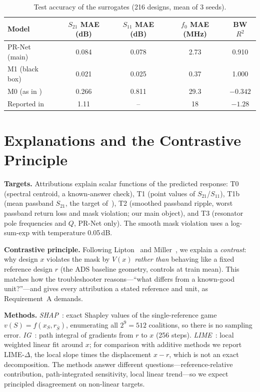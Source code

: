 \documentclass[conference,onecolumn,10pt]{IEEEtran}
\newcommand{\lime}{LIME-$\Delta$}
\begin{document}
\begin{table}[htbp]
\centering
\caption{Test accuracy of the surrogates (216 designs, mean of 3 seeds).}
\label{tab:acc}
\small
\begin{tabular}{lcccc}
\toprule
Model & $S_{21}$ MAE (dB) & $S_{11}$ MAE (dB) & $f_0$ MAE (MHz) & BW $R^2$ \\
\midrule
PR-Net (main) & 0.084 & 0.078 & 2.73 & 0.910 \\
M1 (black box) & 0.021 & 0.025 & 0.37 & 1.000 \\
M0 (as in \cite{suslova2026}) & 0.266 & 0.811 & 29.3 & $-0.342$ \\
Reported in \cite{suslova2026} & 1.11 & -- & 18 & $-1.28$ \\
\bottomrule
\end{tabular}
\end{table}

\section{Explanations and the Contrastive Principle}
\textbf{Targets.} Attributions explain scalar functions of the predicted response:
T0 (spectral centroid, a known-answer check), T1 (point values of $S_{21}$/$S_{11}$),
T1b (mean passband $S_{21}$, the target of~\cite{suslova2026}),
T2 (smoothed passband ripple, worst passband return loss and mask violation; our main object), and T3 (resonator pole frequencies and $Q$, PR-Net only).
The smooth mask violation uses a log-sum-exp with temperature 0.05\,dB.

\textbf{Contrastive principle.} Following Lipton~\cite{lipton1990} and Miller~\cite{miller2019}, we explain a \emph{contrast}: why design $x$ violates the mask by $V(x)$ \emph{rather than} behaving like a fixed reference design $r$ (the ADS baseline geometry, controls at train mean).
This matches how the troubleshooter reasons---``what differs from a known-good unit?''---and gives every attribution a stated reference and unit, as Requirement~A demands.

\textbf{Methods.}
\emph{SHAP}~\cite{lundberg2017,shapley1953}: exact Shapley values of the single-reference game $v(S)=f(x_S,r_{\bar S})$, enumerating all $2^9=512$ coalitions, so there is no sampling error.
\emph{IG}~\cite{sundararajan2017}: path integral of gradients from $r$ to $x$ (256 steps).
\emph{LIME}~\cite{ribeiro2016}: local weighted linear fit around $x$; for comparison with additive methods we report \lime, the local slope times the displacement $x-r$, which is not an exact decomposition.
The methods answer different questions---reference-relative contribution, path-integrated sensitivity, local linear trend---so we expect principled disagreement on non-linear targets.
\end{document}
